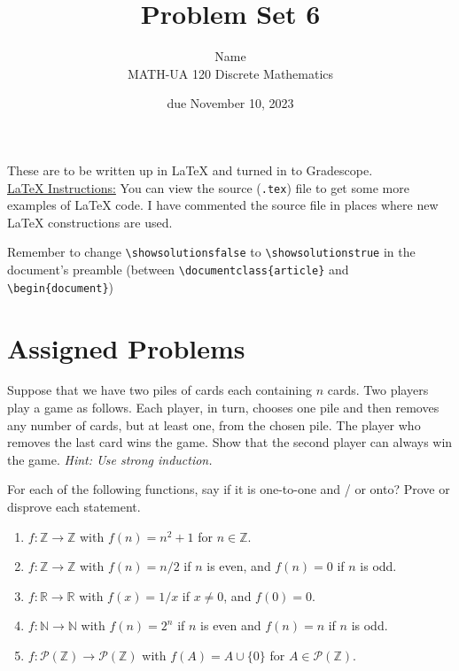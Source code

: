 \documentclass{article}
\title{Problem Set 6}
\author{%
    Name
\\  MATH-UA 120 Discrete Mathematics
}
\date{due November 10, 2023}
\newif\ifshowsolutions
\newcommand{\danger}{\marginpar[\hfill\dbend]{\dbend\hfill}}
\newcommand{\Z}{\mathbb{Z}}
\newcommand{\N}{\mathbb{N}}
\newcommand{\R}{\mathbb{R}}
\theoremstyle{definition}
\begin{document}
\maketitle



These are to be written up in \LaTeX{} and turned in to Gradescope.\\



\ifshowsolutions
    \SetupExSheets{solution/print=true}
\else
    \danger
 \underline{ \LaTeX{}  Instructions:}  You can view the source (\texttt{.tex}) file to get some more examples of \LaTeX{} code.  I have commented the source file in places where new \LaTeX{} constructions are used.
  
  Remember to change \verb|\showsolutionsfalse| to \verb|\showsolutionstrue|
    in the document's preamble 
    (between \verb|\documentclass{article}| and \verb|\begin{document}|)
\fi

\section*{Assigned Problems}


\begin{question}
    Suppose that we have two piles of cards each containing $n$ cards. Two players play a game as follows. Each player, in turn, chooses one pile and then removes any number of cards, but at least one, from the chosen pile. The player who removes the last card wins the game. Show that the second player can always win the game. 
    \textit{Hint: Use strong induction.}
\end{question}
\begin{solution}
\end{solution}


\begin{question}
    For each of the following functions, say if it is one-to-one and / or onto? Prove or disprove each statement.
    \begin{enumerate}
	\item $f : \Z \to \Z$ with $f(n) = n^2 + 1$ for $n \in \Z$.
	\item $f : \Z \to \Z$ with $f(n) = n/2$ if $n$ is even, and $f(n) = 0$ if $n$ is odd.
	\item $f : \R \to \R$ with $f(x) = 1/x$ if $x \neq 0$, and $f(0) = 0$.
	\item $f: \N \to \N$ with $f(n) = 2^n$ if $n$ is even and $f(n) = n$ if $n$ is odd.
	\item $f : \mathcal{P}(\Z) \to \mathcal{P}(\Z)$ with $f(A) = A \cup \{ 0 \}$ for $A \in \mathcal{P}(\Z)$.
    \end{enumerate}
\end{question}
\begin{solution}
\end{solution}
\end{document}
